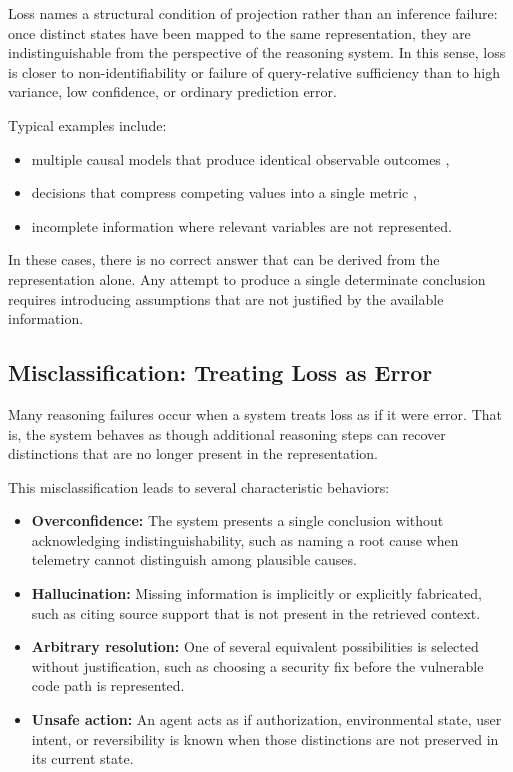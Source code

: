 \documentclass[11pt]{article}
\begin{document}
Loss names a structural condition of projection rather than an inference failure: once distinct states have been mapped to the same representation, they are indistinguishable from the perspective of the reasoning system. In this sense, loss is closer to non-identifiability or failure of query-relative sufficiency than to high variance, low confidence, or ordinary prediction error.

Typical examples include:
\begin{itemize}[leftmargin=1.5em]
    \item multiple causal models that produce identical observable outcomes \cite{Pearl2009},
    \item decisions that compress competing values into a single metric \cite{Savage1954},
    \item incomplete information where relevant variables are not represented.
\end{itemize}

In these cases, there is no correct answer that can be derived from the representation alone. Any attempt to produce a single determinate conclusion requires introducing assumptions that are not justified by the available information.

\subsection{Misclassification: Treating Loss as Error}

Many reasoning failures occur when a system treats loss as if it were error. That is, the system behaves as though additional reasoning steps can recover distinctions that are no longer present in the representation.

This misclassification leads to several characteristic behaviors:
\begin{itemize}[leftmargin=1.5em]
    \item \textbf{Overconfidence:} The system presents a single conclusion without acknowledging indistinguishability, such as naming a root cause when telemetry cannot distinguish among plausible causes.
    \item \textbf{Hallucination:} Missing information is implicitly or explicitly fabricated, such as citing source support that is not present in the retrieved context.
    \item \textbf{Arbitrary resolution:} One of several equivalent possibilities is selected without justification, such as choosing a security fix before the vulnerable code path is represented.
    \item \textbf{Unsafe action:} An agent acts as if authorization, environmental state, user intent, or reversibility is known when those distinctions are not preserved in its current state.
\end{itemize}
\end{document}

